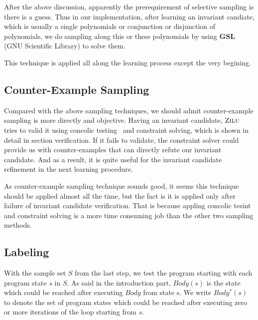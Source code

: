 After the above discussion, apparently the prerequirement of selective sampling is there is a guess.
Thus in our implementation, after learning an invariant candiate, 
which is usually a single polynomials or conjunction or disjunction of polynomials,
we do sampling along this or these polynomials by using \textbf{GSL} (GNU Scientific Library) to solve them.

This technique is applied all along the learning process except the very begining.



\subsection{Counter-Example Sampling}
Compared with the above sampling techniques, we should admit counter-example sampling is more directly and objective.  
Having an invariant candidate, $\textsc{Zilu}$ tries to valid it using concolic testing~\cite{} and constraint solving,
which is shown in detail in section verification.
If it fails to validate, the constraint solver could provide us with counter-examples that can directly refute our invariant candidate.
And as a result, it is quite useful for the invariant candidate refinement in the next learning procedure.

As counter-example sampling technique sounds good, it seems this technique should be applied almost all the time, 
but the fact is it is applied only after failure of invariant candidate verification.
That is because appling concolic tesint and constraint solving is a more time consuming job than the other two sampling methods.

\subsection {Labeling}
With the sample set $S$ from the last step, we test the program starting with each program state $s$ in $S$. 
As said in the introduction part, $Body(s)$ is the state which could be reached after executing $Body$ from state s.
We write $Body^*(s)$ to denote the set of program states which could be reached after executing zero or more iterations of the loop starting from $s$.

